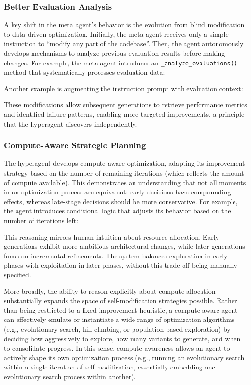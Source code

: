 \documentclass[]{fairmeta}
\begin{document}
\subsubsection{Better Evaluation Analysis}

A key shift in the meta agent's behavior is the evolution from blind modification to data-driven optimization. Initially, the meta agent receives only a simple instruction to ``modify any part of the codebase''. Then, the agent autonomously develops mechanisms to analyze previous evaluation results before making changes. For example, the meta agent introduces an \texttt{\_analyze\_evaluations()} method that systematically processes evaluation data:


Another example is augmenting the instruction prompt with evaluation context:


These modifications allow subsequent generations to retrieve performance metrics and identified failure patterns, enabling more targeted improvements, a principle that the hyperagent discovers independently.

\subsubsection{Compute-Aware Strategic Planning}

The hyperagent develops compute-aware optimization, adapting its improvement strategy based on the number of remaining iterations (which reflects the amount of compute available). This demonstrates an understanding that not all moments in an optimization process are equivalent: early decisions have compounding effects, whereas late-stage decisions should be more conservative. For example, the agent introduces conditional logic that adjusts its behavior based on the number of iterations left:


This reasoning mirrors human intuition about resource allocation. Early generations exhibit more ambitious architectural changes, while later generations focus on incremental refinements. The system balances exploration in early phases with exploitation in later phases, without this trade-off being manually specified.

More broadly, the ability to reason explicitly about compute allocation substantially expands the space of self-modification strategies possible. Rather than being restricted to a fixed improvement heuristic, a compute-aware agent can effectively emulate or instantiate a wide range of optimization algorithms (e.g., evolutionary search, hill climbing, or population-based exploration) by deciding how aggressively to explore, how many variants to generate, and when to consolidate progress. In this sense, compute awareness allows an agent to actively shape its own optimization process (e.g., running an evolutionary search within a single iteration of self-modification, essentially embedding one evolutionary search process within another).
\end{document}
